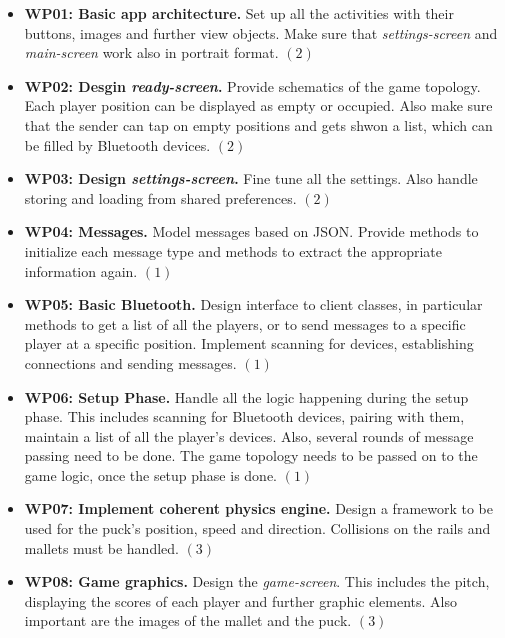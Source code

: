 \documentclass{report}
\begin{document}
\begin{itemize}
        \item {\bf WP01:  Basic app architecture.} Set up all the activities with their buttons, images and further view objects. Make sure that \textit{settings-screen} and \textit{main-screen} work also in portrait format. $(2)$
        
        \item {\bf WP02: Desgin \textit{ready-screen}.} Provide schematics of the game topology. Each player position can be displayed as empty or occupied. Also make sure that the sender can tap on empty positions and gets shwon a list, which can be filled by Bluetooth devices. $(2)$
        
        \item {\bf WP03: Design \textit{settings-screen}.} Fine tune all the settings. Also handle storing and loading from shared preferences. $(2)$
        
        \item {\bf WP04: Messages.} Model messages based on JSON. Provide methods to initialize each message type and methods to extract the appropriate information again. $(1)$
        
        \item {\bf WP05: Basic Bluetooth.} Design interface to client classes, in particular methods to get a list of all the players, or to send messages to a specific player at a specific position. Implement scanning for devices, establishing connections and sending messages. $(1)$
        
        \item {\bf WP06: Setup Phase.} Handle all the logic happening during the setup phase. This includes scanning for Bluetooth devices, pairing with them, maintain a list of all the player's devices. Also, several rounds of message passing need to be done. The game topology needs to be passed on to the game logic, once the setup phase is done. $(1)$
        
         \item {\bf WP07: Implement coherent physics engine.} Design a framework to be used for the puck's position, speed and direction. Collisions on the rails and mallets must be handled. $(3)$
         
        	\item {\bf WP08: Game graphics.} Design the \textit{game-screen}. This includes the pitch, displaying the scores of each player and further graphic elements. Also important are the images of the mallet and the puck. $(3)$
	

\end{itemize}
\end{document}
